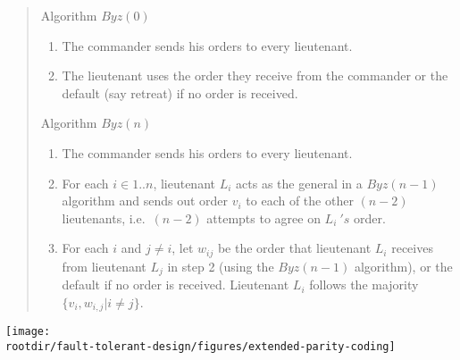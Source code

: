 \documentclass[11pt]{article}
\def\rootdir{../}
\begin{document}
\begin{quote}
Algorithm \(Byz(0)\)\\
\begin{enumerate}
\setlength{\itemsep}{0pt}\setlength{\topsep}{0pt}

\item The commander sends his orders to every lieutenant.

\item The lieutenant uses the order they receive from the commander or
the default (say retreat) if no order is received. 

\end{enumerate}

Algorithm \(Byz(n)\)\\
\begin{enumerate}
\setlength{\itemsep}{0pt}\setlength{\topsep}{0pt}

\item The commander sends his orders to every lieutenant. 


\item For each \(i \in 1.. n\), lieutenant \(L_i\) acts as the general in a \(Byz(n-1)\) algorithm and sends out order \(v_i\) to each of the other \((n-2)\)  lieutenants, i.e.\ \((n-2)\) attempts to agree on \(L_i\ 's\) order.

\item For each \(i\) and \(j \not = i\), let \(w_{ij}\) be the order
that lieutenant \(L_i\) receives from lieutenant \(L_j\) in step 2
(using the \(Byz(n-1)\) algorithm), or the default if no order is
received.  Lieutenant \(L_i\) follows the majority \(\{v_i,
w_{i,j}|i\not = j\}\).

\end{enumerate}

\end{quote}

\pagebreak

\begin{center}
\texttt{[image: \\rootdir/fault-tolerant-design/figures/extended-parity-coding]}
\end{center}
\end{document}
